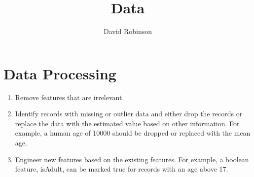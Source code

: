 \documentclass{article}
\title{Data}
\author{David Robinson}
\date{}
\begin{document}
\maketitle

\section*{Data Processing}

\begin{enumerate}
    \item Remove features that are irrelevant.
    \item Identify records with missing or outlier data and either drop the records or replace the data with the estimated value based on other information. For example, a human age of 10000 should be dropped or replaced with the mean age.
    \item Engineer new features based on the existing features. For example, a boolean feature, isAdult, can be marked true for records with an age above 17.
\end{enumerate}
\end{document}
